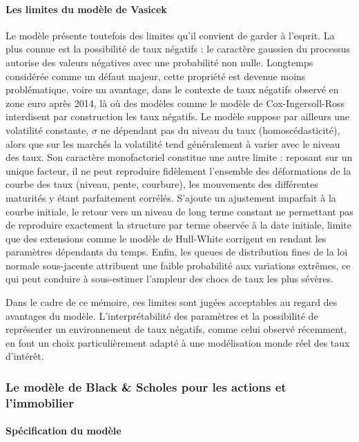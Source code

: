 \paragraph{Les limites du modèle de Vasicek}

Le modèle présente toutefois des limites qu'il convient de garder à l'esprit. La plus connue est la possibilité de taux négatifs : le caractère gaussien du processus autorise des valeurs négatives avec une probabilité non nulle. Longtemps considérée comme un défaut majeur, cette propriété est devenue moins problématique, voire un avantage, dans le contexte de taux négatifs observé en zone euro après 2014, là où des modèles comme le modèle de Cox-Ingersoll-Ross interdisent par construction les taux négatifs. 
Le modèle suppose par ailleurs une volatilité constante, $\sigma$ ne dépendant pas du niveau du taux (homoscédasticité), alors que sur les marchés la volatilité tend généralement à varier avec le niveau des taux. Son caractère monofactoriel constitue une autre limite : reposant sur un unique facteur, il ne peut reproduire fidèlement l'ensemble des déformations de la courbe des taux (niveau, pente, courbure), les mouvements des différentes maturités y étant parfaitement corrélés. S'ajoute un ajustement imparfait à la courbe initiale, le retour vers un niveau de long terme constant ne permettant pas de reproduire exactement la structure par terme observée à la date initiale, limite que des extensions comme le modèle de Hull-White corrigent en rendant les paramètres dépendants du temps. Enfin, les queues de distribution fines de la loi normale sous-jacente attribuent une faible probabilité aux variations extrêmes, ce qui peut conduire à sous-estimer l'ampleur des chocs de taux les plus sévères.

Dans le cadre de ce mémoire, ces limites sont jugées acceptables au regard des avantages du modèle. L'interprétabilité des paramètres et la possibilité de représenter un environnement de taux négatifs, comme celui observé récemment, en font un choix particulièrement adapté à une modélisation monde réel des taux d'intérêt.

\subsubsection{Le modèle de Black \& Scholes pour les actions et l'immobilier}

\paragraph{Spécification du modèle}


